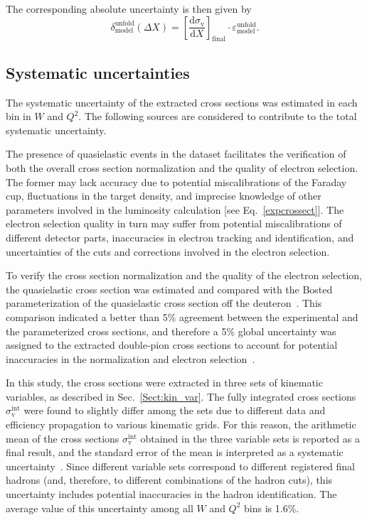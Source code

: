 \documentclass[prc,twocolumn,superscriptaddress,showpacs,amssymb,amsmath,amsfonts,aps,nofootinbib]{revtex4-1}
\begin{document}
The corresponding absolute uncertainty is then given by
\begin{equation}
\delta^{\text{unfold}}_{\text{model}} (\Delta X) = \left [ \frac{\textrm{d}\sigma_{\text{v}}}{\textrm{d}X} \right ]_{\text{final}}\!\! \cdot \varepsilon^{\text{unfold}}_{\text{model}}.
\label{eq:error_stat_mod_fermi}
\end{equation}



\subsection{Systematic uncertainties}
\label{Sect:sys_uncert}

The systematic uncertainty of the extracted cross sections was estimated in each bin in $W$ and $Q^{2}$. The following sources are considered to contribute to the total systematic uncertainty.


The presence of quasielastic events in the dataset facilitates the verification of both the overall cross section normalization and the quality of electron selection. The former may lack accuracy due to potential miscalibrations of the Faraday cup, fluctuations in the target density, and imprecise knowledge of other parameters involved in the luminosity calculation [see Eq.\!~\eqref{expcrossect}]. The electron selection quality in turn may suffer from potential miscalibrations of different detector parts, inaccuracies in electron tracking and identification, and uncertainties of the cuts and corrections involved in the electron selection.

To verify the cross section normalization and the quality of the electron selection, the quasielastic cross section was estimated and compared with the Bosted  parameterization of the quasielastic cross section off the deuteron~\cite{Bosted_fit,Bosted:2007xd}. This comparison indicated a better than 5\% agreement between the experimental and the parameterized cross sections, and therefore a 5\% global uncertainty was assigned to the extracted double-pion cross sections to account for potential inaccuracies in the normalization and electron selection~\cite{my_an_note:2020, my_thesis:2021}.


In this study, the cross sections were extracted in three sets of kinematic variables, as described in Sec.\!~\ref{Sect:kin_var}. The fully integrated cross sections $\sigma_{\text{v}}^{\text{int}}$ were found to slightly differ among the sets due to different data and efficiency propagation to various kinematic grids. For this reason, the arithmetic mean of the cross sections $\sigma_{\text{v}}^{\text{int}}$ obtained in the three variable sets is reported as a final result, and the standard error of the mean is interpreted as a systematic uncertainty~\cite{my_an_note:2020, my_thesis:2021}. Since different variable sets correspond to different registered final hadrons (and, therefore, to different combinations of the hadron cuts), this uncertainty includes potential inaccuracies in the hadron identification. The average value of this uncertainty among all $W$ and $Q^{2}$ bins is 1.6\%.
\end{document}
